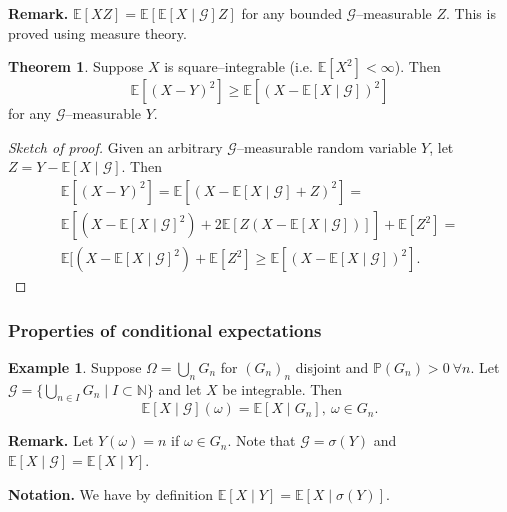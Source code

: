 \documentclass{article}
\theoremstyle{definition}
\newtheorem{theorem}{Theorem}[section]
\newtheorem{example}{Example}[section]
\begin{document}
\textbf{Remark.} $\mathbb{E}[XZ] = \mathbb{E}[\mathbb{E}[X \mid \mathcal{G}]Z]$ for any bounded $\mathcal{G}$--measurable $Z$. This is proved using measure theory.
\begin{theorem}
    Suppose $X$ is square--integrable (i.e. $\mathbb{E}[X^2]<\infty$). Then $$\mathbb{E}[(X-Y)^2] \ge \mathbb{E}[(X-\mathbb{E}[X \mid \mathcal{G}])^2]$$ for any $\mathcal{G}$--measurable $Y$.
\end{theorem}
\begin{proof}[Sketch of proof]
    Given an arbitrary $\mathcal{G}$--measurable random variable $Y$, let $Z = Y - \mathbb{E}[X \mid \mathcal{G}]$. Then
    \begin{align*}
        \mathbb{E}[(X-Y)^2] = \mathbb{E}[(X-\mathbb{E}[X \mid \mathcal{G}] + Z)^2] = \\ 
        \mathbb{E}[(X-\mathbb{E}[X \mid \mathcal{G}]^2) + 2\mathbb{E}[Z(X-\mathbb{E}[X \mid \mathcal{G}])]] + \mathbb{E}[Z^2] = \\
        \mathbb{E}[(X-\mathbb{E}[X \mid \mathcal{G}]^2) + \mathbb{E}[Z^2] \ge \mathbb{E}[(X- \mathbb{E}[X \mid  \mathcal{G}])^2].
    \end{align*}
\end{proof}

\subsubsection{Properties of conditional expectations} 


\begin{example}
    Suppose $\Omega = \bigcup_{n} G_n$ for $(G_n)_n$ disjoint and $\mathbb{P}(G_n)>0 ~\forall n$. Let ${\mathcal{G} = \{\bigcup_{n \in I} G_n \mid I \subset \mathbb{N}\}}$ and let $X$ be integrable. Then \[
    \mathbb{E}[X \mid \mathcal{G}](\omega) = \mathbb{E}[X \mid G_n], ~\omega \in G_n.
    \]
\end{example}
\textbf{Remark.} Let $Y(\omega) = n$ if $ \omega \in G_n$. Note that $\mathcal{G} = \sigma(Y)$ and $\mathbb{E}[X \mid \mathcal{G}] = \mathbb{E}[X \mid Y]$.
\vspace{1mm}

\textbf{Notation.} We have by definition $\mathbb{E}[X \mid Y] = \mathbb{E}[X \mid \sigma(Y)]$.
\end{document}

